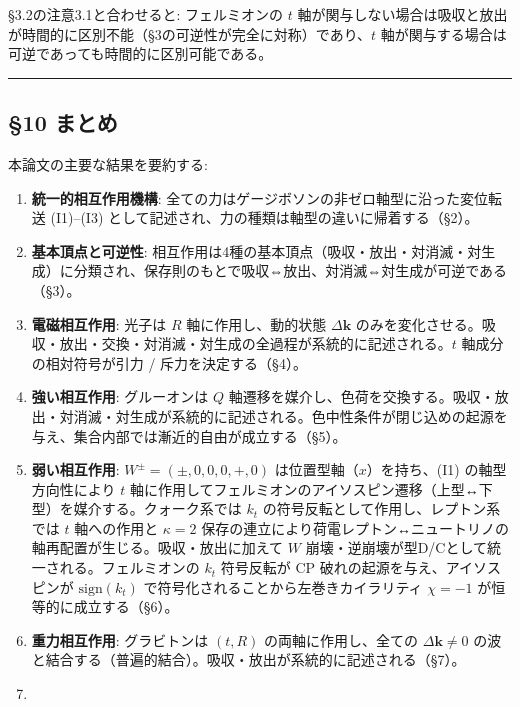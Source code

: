 \documentclass[
  a4paper,11pt]{ltjsarticle}
\theoremstyle{definition}
\theoremstyle{remark}
\begin{document}
§3.2の注意3.1と合わせると: フェルミオンの \(t\)
軸が関与しない場合は吸収と放出が時間的に区別不能（§3の可逆性が完全に対称）であり、\(t\)
軸が関与する場合は可逆であっても時間的に区別可能である。

\begin{center}\rule{0.5\linewidth}{0.5pt}\end{center}

\subsection{§10 まとめ}\label{ux307eux3068ux3081}

本論文の主要な結果を要約する:

\begin{enumerate}
\def\labelenumi{\arabic{enumi}.}
\item
  \textbf{統一的相互作用機構}:
  全ての力はゲージボソンの非ゼロ軸型に沿った変位転送 (I1)--(I3)
  として記述され、力の種類は軸型の違いに帰着する（§2）。
\item
  \textbf{基本頂点と可逆性}:
  相互作用は4種の基本頂点（吸収・放出・対消滅・対生成）に分類され、保存則のもとで吸収⇔放出、対消滅⇔対生成が可逆である（§3）。
\item
  \textbf{電磁相互作用}: 光子は \(R\) 軸に作用し、動的状態
  \(\Delta\mathbf{k}\)
  のみを変化させる。吸収・放出・交換・対消滅・対生成の全過程が系統的に記述される。\(t\)
  軸成分の相対符号が引力 / 斥力を決定する（§4）。
\item
  \textbf{強い相互作用}: グルーオンは \(Q\)
  軸遷移を媒介し、色荷を交換する。吸収・放出・対消滅・対生成が系統的に記述される。色中性条件が閉じ込めの起源を与え、集合内部では漸近的自由が成立する（§5）。
\item
  \textbf{弱い相互作用}: \(W^{\pm} = (\pm, 0, 0, 0, +, 0)\)
  は位置型軸（\(x\)）を持ち、(I1) の軸型方向性により \(t\)
  軸に作用してフェルミオンのアイソスピン遷移（上型↔下型）を媒介する。クォーク系では
  \(k_t\) の符号反転として作用し、レプトン系では \(t\) 軸への作用と
  \(\kappa = 2\)
  保存の連立により荷電レプトン↔ニュートリノの軸再配置が生じる。吸収・放出に加えて
  \(W\) 崩壊・逆崩壊が型D/Cとして統一される。フェルミオンの \(k_t\)
  符号反転が CP 破れの起源を与え、アイソスピンが \(\mathrm{sign}(k_t)\)
  で符号化されることから左巻きカイラリティ \(\chi = -1\)
  が恒等的に成立する（§6）。
\item
  \textbf{重力相互作用}: グラビトンは \((t, R)\) の両軸に作用し、全ての
  \(\Delta\mathbf{k} \neq 0\)
  の波と結合する（普遍的結合）。吸収・放出が系統的に記述される（§7）。
\item

\end{enumerate}
\end{document}
